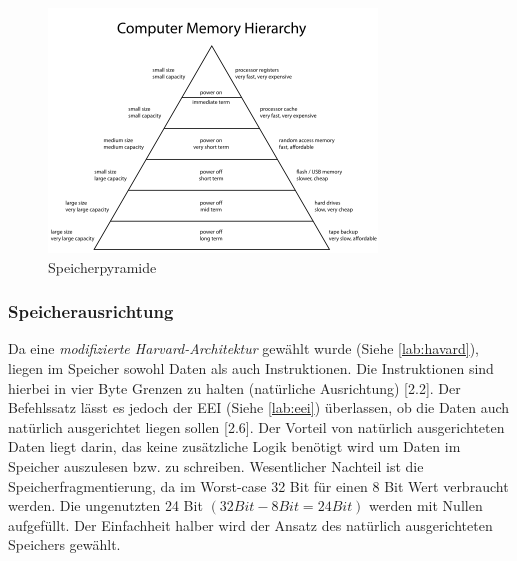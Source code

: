                 \begin{figure}[H]
                    \centering
                    \includegraphics[scale=0.2]{img/speicherpyramide.png}
                    \caption[Speicherpyramide]{Speicherpyramide \cite{memory-hierarchy}}
                    \label{fig:memory-hierarchy}
                \end{figure}


            \subsubsection{Speicherausrichtung}\label{lab:mem-order}
                Da eine \textit{modifizierte Harvard-Architektur} gewählt wurde (Siehe \ref{lab:havard}), liegen im Speicher
                sowohl Daten als auch Instruktionen. Die Instruktionen sind hierbei in vier Byte Grenzen zu halten
                (natürliche Ausrichtung) \cite{riscv-isa-specs}[2.2].
                Der Befehlssatz lässt es jedoch der EEI (Siehe \ref{lab:eei}) überlassen, ob die Daten auch natürlich ausgerichtet liegen sollen
                \cite{riscv-isa-specs}[2.6].
                Der Vorteil von natürlich ausgerichteten Daten liegt darin, das keine zusätzliche Logik benötigt wird um Daten im Speicher
                auszulesen bzw. zu schreiben. Wesentlicher Nachteil ist die Speicherfragmentierung, da im Worst-case 32 Bit für einen 8 Bit 
                Wert verbraucht werden. Die ungenutzten 24 Bit $(32 Bit - 8 Bit = 24 Bit)$ werden mit Nullen aufgefüllt.
                Der Einfachheit halber wird der Ansatz des natürlich ausgerichteten Speichers gewählt.

                





                
            
                
            
           
            
            

            

            



            
    
        

    
